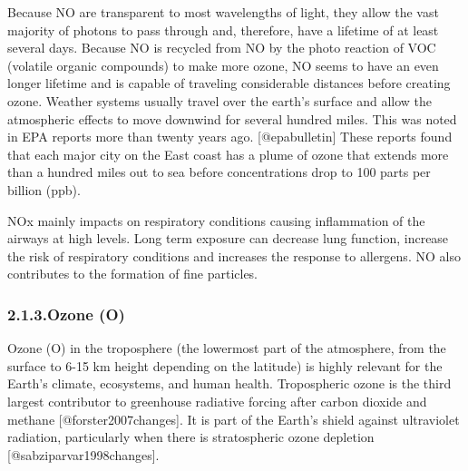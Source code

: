 \documentclass[9pt]{report}
\begin{document}
Because NO are transparent to most wavelengths of light, they allow the vast majority of photons to pass through and, therefore, have a lifetime of at least several days.
Because NO is  recycled from NO by the photo reaction of VOC (volatile organic compounds) to make more ozone, NO seems to have an even longer lifetime and is capable of traveling considerable distances before creating ozone.  Weather systems usually travel over the earth’s surface and allow the atmospheric effects to move downwind for several hundred miles.
This was noted in EPA reports more than twenty years ago. [@epabulletin]
These reports found that each major city on the East coast has a plume of ozone that extends more than a hundred miles out to sea before concentrations drop to 100 parts per billion (ppb).%

NOx mainly impacts on respiratory conditions causing inflammation of the airways at high levels. Long term exposure can decrease lung function, increase the risk of respiratory conditions and increases the response to allergens.
NO also contributes to the formation of fine particles.%

\subsubsection{2.1.3.\hspace*{0.5em}Ozone (O)}\label{sec-ozone-o3}%

\noindent{}Ozone (O) in the troposphere (the lowermost part of the atmosphere, from the surface to 6-15 km height depending on the latitude) is highly relevant for the Earth’s climate, ecosystems, and human health.
Tropospheric ozone is the third largest contributor to greenhouse radiative forcing after carbon dioxide and methane [@forster2007changes].
It is part of the Earth’s shield against ultraviolet radiation, particularly when there is stratospheric ozone depletion [@sabziparvar1998changes].%
\end{document}
